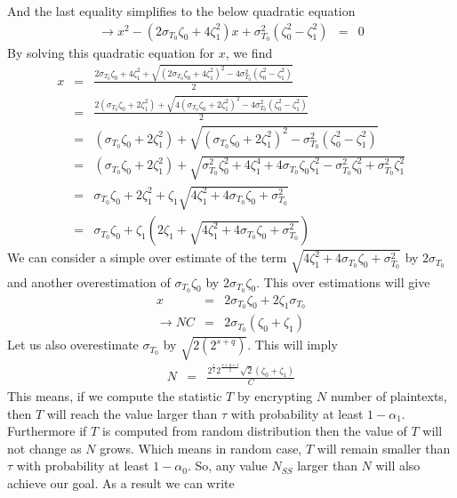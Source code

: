 And the last equality simplifies to the below quadratic equation
\begin{eqnarray*}
\rightarrow x^2 - \left(2\sigma_{T_0}\zeta_0 + 4\zeta^2_1 \right)x + \sigma^2_{T_0} \left(\zeta_0^2 - \zeta^2_1\right) &=&  0 
\end{eqnarray*}
By solving this quadratic equation for $x$, we find
\begin{eqnarray*}
x &=& \frac{2\sigma_{T_0}\zeta_0+4\zeta_1^2 + \sqrt{\left(2\sigma_{T_0}\zeta_0 + 4\zeta^2_1 \right)^2 - 4\sigma^2_{T_0} \left(\zeta_0^2 - \zeta^2_1\right)}}{2} \\
&=&  \frac{2\left(\sigma_{T_0}\zeta_0+2\zeta_1^2\right) + \sqrt{4\left(\sigma_{T_0}\zeta_0 + 2\zeta^2_1 \right)^2 - 4\sigma^2_{T_0} \left(\zeta_0^2 - \zeta^2_1\right)}}{2}\\
&=&  \left(\sigma_{T_0}\zeta_0+2\zeta_1^2\right) + \sqrt{\left(\sigma_{T_0}\zeta_0 + 2\zeta^2_1 \right)^2 - \sigma^2_{T_0} \left(\zeta_0^2 - \zeta^2_1\right)} \\
&=&  \left(\sigma_{T_0}\zeta_0+2\zeta_1^2\right) + \sqrt{\sigma_{T_0}^2\zeta_0^2 + 4\zeta^4_1 + 4\sigma_{T_0}\zeta_0\zeta^2_1 - \sigma^2_{T_0}\zeta_0^2 + \sigma^2_{T_0}\zeta^2_1}\\
&=&  \sigma_{T_0}\zeta_0+2\zeta_1^2 + \zeta_1\sqrt{4\zeta^2_1 + 4\sigma_{T_0}\zeta_0 + \sigma^2_{T_0}}\\
&=&  \sigma_{T_0}\zeta_0 + \zeta_1 \left(2\zeta_1 + \sqrt{4\zeta^2_1 + 4\sigma_{T_0}\zeta_0 + \sigma^2_{T_0}}\right)
\end{eqnarray*}
We can consider a simple over estimate of the term $\sqrt{4\zeta^2_1 + 4\sigma_{T_0}\zeta_0 + \sigma^2_{T_0}}$ by $2\sigma_{T_0}$ and another overestimation of $\sigma_{T_0}\zeta_0$ by $2\sigma_{T_0}\zeta_0$. This over estimations will give
\begin{eqnarray*}
x &=& 2\sigma_{T_0}\zeta_0 + 2 \zeta_1 \sigma_{T_0}\\
\rightarrow NC &=& 2\sigma_{T_0}\left(\zeta_0 + \zeta_1 \right)
\end{eqnarray*}
Let us also overestimate $\sigma_{T_0}$ by $\sqrt{2\left(2^{s+q}\right)}$. This will imply
\begin{eqnarray*}
N &=& \frac{2^{\frac{1}{2}}2^\frac{s+q+1}{2}\sqrt{2}\left(\zeta_0 + \zeta_1 \right)}{C}
\end{eqnarray*}
This means, if we compute the statistic $T$ by encrypting $N$ number of plaintexts, then $T$ will reach the value larger than $\tau$ with probability at least $1-\alpha_1$. Furthermore if $T$ is computed from random distribution then the value of $T$ will not change as $N$ grows. Which means in random case, $T$ will remain smaller than $\tau$ with probability at least $1-\alpha_0$. So, any value $N_{SS}$ larger than $N$ will also achieve our goal. As a result we can write
